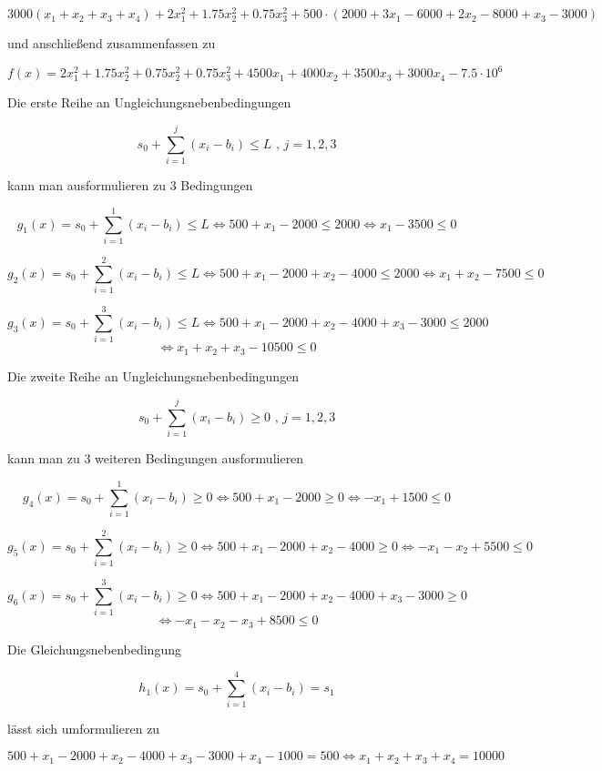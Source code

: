 \documentclass[a4paper, 12pt]{report}
\begin{document}
\begin{adjustwidth}{-35pt}{0pt}
$$ 3000(x_1 + x_2 + x_3 + x_4) + 2x_1^2 + 1.75x_2^2 + 0.75x_3^2 + 500\cdot \left( 2000 + 3x_1 - 6000 + 2x_2 - 8000 + x_3 - 3000 \right) $$
\end{adjustwidth}

und anschließend zusammenfassen zu

$$ f(x) = 2x_1^2 + 1.75x_2^2 + 0.75x_2^2 + 0.75x_3^2 + 4500x_1 + 4000x_2 + 3500x_3 + 3000x_4 - 7.5\cdot 10^6 $$

Die erste Reihe an Ungleichungsnebenbedingungen

$$ s_0 + \sum_{i=1}^j \left( x_i - b_i \right) \leq L \text{ , } j = 1,2,3 $$

kann man ausformulieren zu 3 Bedingungen

$$ g_1(x) = s_0 + \sum_{i=1}^1 \left(x_i - b_i\right) \leq L \Leftrightarrow 500 + x_1 - 2000 \leq 2000 \Leftrightarrow x_1 - 3500 \leq 0 $$

$$ g_2(x) = s_0 + \sum_{i=1}^2 \left(x_i - b_i\right) \leq L \Leftrightarrow 500 + x_1 - 2000 + x_2 - 4000 \leq 2000 \Leftrightarrow x_1 + x_2 - 7500 \leq 0 $$

$$ g_3(x) = s_0 + \sum_{i=1}^3 \left(x_i - b_i\right) \leq L \Leftrightarrow 500 + x_1 - 2000 + x_2 - 4000 + x_3 - 3000 \leq 2000 $$
$$ \Leftrightarrow x_1 + x_2 + x_3 - 10500 \leq 0 $$

Die zweite Reihe an Ungleichungsnebenbedingungen

$$ s_0 + \sum_{i=1}^j \left( x_i - b_i \right) \geq 0 \text{ , } j=1,2,3 $$

kann man zu 3 weiteren Bedingungen ausformulieren

$$ g_4(x) = s_0 + \sum_{i=1}^1 \left( x_i - b_i \right) \geq 0 \Leftrightarrow 500 + x_1 - 2000 \geq 0 \Leftrightarrow -x_1 + 1500 \leq 0 $$

$$ g_5(x) = s_0 + \sum_{i=1}^2 \left( x_i - b_i \right) \geq 0 \Leftrightarrow 500 + x_1 - 2000 + x_2 - 4000 \geq 0 \Leftrightarrow -x_1 - x_2 + 5500 \leq 0 $$

$$ g_6(x) = s_0 + \sum_{i=1}^3 \left( x_i - b_i \right) \geq 0 \Leftrightarrow 500 + x_1 - 2000 + x_2 - 4000 + x_3 - 3000 \geq 0 $$
$$ \Leftrightarrow -x_1 - x_2 - x_3 + 8500 \leq 0 $$

Die Gleichungsnebenbedingung 

$$ h_1(x) = s_0 + \sum_{i=1}^4 \left( x_i - b_i \right) = s_1 $$

lässt sich umformulieren zu

$$ 500 + x_1 - 2000 + x_2 - 4000 + x_3 - 3000 + x_4 - 1000 = 500 \Leftrightarrow x_1 + x_2 + x_3 + x_4 = 10000 $$
\end{document}
